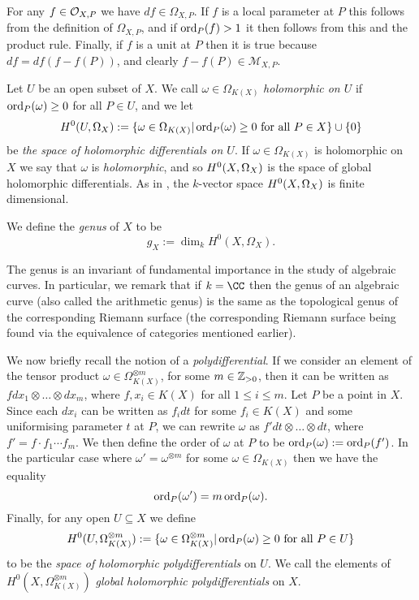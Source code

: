 For any $f \in {\cal O}_{X,P}$ we have $df \in \Omega_{X,P}$.
If $f$ is a local parameter at $P$ this follows from the definition of $\Omega_{X,P}$, and if $\operatorname{ord}_P(f) >1$ it then follows from this and the product rule.
Finally, if $f$ is a unit at $P$ then it is true because $df = df(f - f(P))$, and clearly $f - f(P) \in \mathcal{M}_{X,P}$.

Let $U$ be an open subset of $X$.
We call $\omega \in \Omega_{K(X)}$ \emph{holomorphic on $U$} if $\operatorname{ord}_P(\omega) \geq 0$ for all $P \in U$, and we let
    \[
    H^0(U, \Omega_X) := \{ \omega \in \Omega_{K(X)} | \operatorname{ord}_P(\omega) \geq 0\ \text{for all}\ P \in X\} \cup \{ 0 \}
    \]
be \emph{the space of holomorphic differentials on $U$}.
If $\omega \in \Omega_{K(X)}$ is holomorphic on $X$ we say that $\omega$ is \emph{holomorphic}, and so ${H^0(X,\Omega_X)}$ is the space of global holomorphic differentials.
As in \cite[Chap.\ 8, \S 2, Prop.\ 3]{fulton}, the $k$-vector space ${H^0(X,\Omega_X)}$ is finite dimensional.

    \begin{defn}\label{definitiongenus}
    We define the \emph{genus} of $X$ to be
        \[
        g_X := \dim_k H^0(X,\Omega_X).
        \]
    \end{defn}

The genus is an invariant of fundamental importance in the study of algebraic curves.
In particular, we remark that if $k = \CC$ then the genus of an algebraic curve (also called the arithmetic genus) is the same as the topological genus of the corresponding Riemann surface (the corresponding Riemann surface being found via the equivalence of categories mentioned earlier).

We now briefly recall the notion of a \emph{polydifferential}.
If we consider an element of the tensor product $\omega \in \Omega_{K(X)}^{\otimes m}$, for some $m \in {\mathbb Z}_{>0}$, then it can be written as $f dx_1\otimes \ldots \otimes dx_m$, where $f, x_i \in K(X)$ for all $1 \leq i \leq m$.
Let $P$ be a point in $X$.
Since each $dx_i$ can be written as $f_i dt$ for some $f_i\in K(X)$ and some uniformising parameter $t$ at $P$, we can rewrite $\omega$ as $f' dt \otimes \ldots \otimes dt$, where $f' = f \cdot f_1 \cdots f_m$.
We then define the order of $\omega$ at $P$ to be $\operatorname{ord}_P(\omega ) := \operatorname{ord}_P(f')$.
In the particular case where $\omega' = \omega^{\otimes m}$ for some $\omega \in \Omega_{K(X)}$ then we have the equality
    \[ 
    \operatorname{ord}_P(\omega') = m\operatorname{ord}_P(\omega).
    \]
Finally, for any open $U \subseteq X$ we define 
    \[
    H^0(U,\Omega_{K(X)}^{\otimes m}):= \{\omega \in \Omega_{K(X)}^{\otimes m} | \ord_P(\omega) \geq 0 \ \text{for all}\ P \in U\}
    \]
to be the \emph{space of holomorphic polydifferentials} on $U$.
We call the elements of $H^0(X,\Omega_{K(X)}^{\otimes m})$ \emph{global holomorphic polydifferentials} on $X$.



